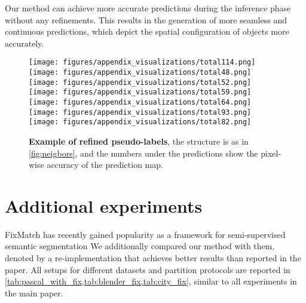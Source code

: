 \documentclass{article}
\renewcommand{\cite}[1]{\citep{#1}}
\begin{document}
Our method can achieve more accurate predictions during the inference phase without any refinements. This results in the generation of more seamless and continuous predictions, which depict the spatial configuration of objects more accurately.

\begin{figure*}\label{fig:images_app}\centering
    \caption{\textbf{Example of refined pseudo-labels}, the structure is as in \cref{fig:neigbors}, and the numbers under the predictions show the pixel-wise accuracy of the prediction map.}
    \label{fig:my_label}
    \texttt{[image: figures/appendix\_visualizations/total114.png]}
\texttt{[image: figures/appendix\_visualizations/total48.png]}
\texttt{[image: figures/appendix\_visualizations/total52.png]}
\texttt{[image: figures/appendix\_visualizations/total59.png]}
\texttt{[image: figures/appendix\_visualizations/total64.png]}
\texttt{[image: figures/appendix\_visualizations/total93.png]}
\texttt{[image: figures/appendix\_visualizations/total82.png]}
\end{figure*}

\iffalse
\section{Additional experiments}
FixMatch has recently gained popularity as a framework for semi-supervised semantic segmentation \cite{Rabadan2022DenseFA}
We additionally compared our method with them, denoted by  a re-implementation that achieves better results than reported in the paper. All setups for different datasets and partition protocols are reported in \cref{tab:pascal_with_fix,tab:blender_fix,tab:city_fix}, similar to all experiments in the main paper. 
\end{document}
